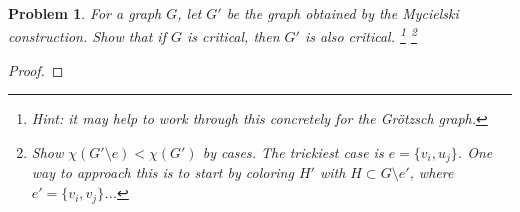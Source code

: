 \documentclass[11pt]{article}
\newtheorem{problem}{Problem}
\begin{document}
\pagebreak

\begin{problem}
For a graph $G$, let $G'$ be the graph obtained by the Mycielski construction. Show that if $G$ is critical, then $G'$ is also critical. \footnote{Hint: it may help to work through this concretely for the Gr\"otzsch graph.}
\footnote{Show $\chi(G'\setminus e)<\chi(G')$ by cases. The trickiest case is $e=\{v_i,u_j\}$. One way to approach this is to start by coloring $H'$ with $H\subset G\setminus e'$, where $e'=\{v_i,v_j\}$...}
\end{problem}

\begin{proof}

\end{proof}
\end{document}
